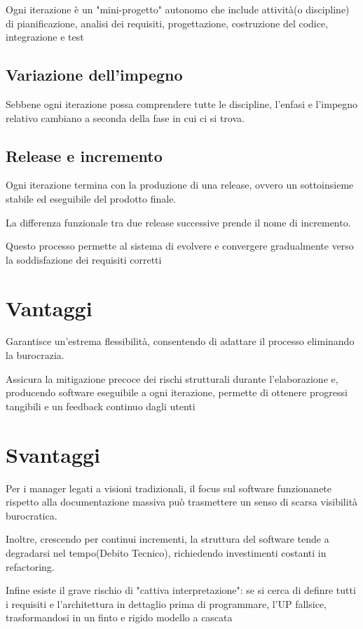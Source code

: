 Ogni iterazione è un "mini-progetto" autonomo che include attività(o discipline) di pianificazione, analisi dei requisiti, progettazione, costruzione del codice, integrazione e test

\subsection{Variazione dell'impegno}
Sebbene ogni iterazione possa comprendere tutte le discipline, l'enfasi e l'impegno relativo cambiano a seconda della fase in cui ci si trova.

\subsection{Release e incremento}
Ogni iterazione termina con la produzione di una release, ovvero un sottoinsieme stabile ed eseguibile del prodotto finale.

La differenza funzionale tra due release successive prende il nome di incremento.

Questo processo permette al sistema di evolvere e convergere gradualmente verso la soddisfazione dei requisiti corretti

\section{Vantaggi}
Garantisce un'estrema flessibilità, consentendo di adattare il processo eliminando la burocrazia.

Assicura la mitigazione precoce dei rischi strutturali durante l'elaborazione e, producendo software eseguibile a ogni iterazione, permette di ottenere progressi tangibili e un feedback continuo dagli utenti

\section{Svantaggi}
Per i manager legati a visioni tradizionali, il focus sul software funzionanete rispetto alla documentazione massiva può trasmettere un senso di scarsa visibilità burocratica.

Inoltre, crescendo per continui incrementi, la struttura del software tende a degradarsi nel tempo(Debito Tecnico), richiedendo investimenti costanti in refactoring.

Infine esiste il grave rischio di "cattiva interpretazione": se si cerca di definre tutti i requisiti e l'architettura in dettaglio prima di programmare, l'UP fallsice, trasformandosi in un finto e rigido modello a cascata


